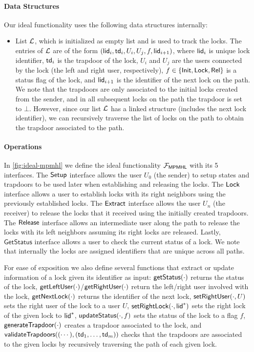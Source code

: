 \paragraph{Data Structures}
Our ideal functionality uses the following data structures internally:

\begin{itemize}
	\item List $\mathcal{L}$, which is initialized as empty list and is used to track the locks. 
	The entries of $\mathcal{L}$ are of the form $(\mathsf{lid}_i, \mathsf{td}_i, U_i, U_j, f, \\ \mathsf{lid}_{i+1})$, 
	where $\mathsf{lid}_i$ is unique lock identifier, $\mathsf{td}_i$ is the trapdoor of the lock, $U_i$ 
	and $U_j$ are the users connected by the lock (the left and right user, respectively), 
	$f \in \{\mathsf{Init},\mathsf{Lock},\mathsf{Rel}\}$ is a status flag of the lock, and $\mathsf{lid}_{i+1}$ is the 
	identifier of the next lock on the path. We note that the trapdoors are only associated 
	to the initial locks created from the sender, and in all subsequent locks on the path the 
	trapdoor is set to $\bot$. However, since our list $\mathcal{L}$ has a linked structure (includes 
	the next lock identifier), we can recursively traverse the list of locks on the path to 
	obtain the trapdoor associated to the path.
\end{itemize}

\paragraph{Operations}
In \cref{fig:ideal-mpmhl} we define the ideal functionality $\mathcal{F}_{\mathsf{MPMHL}}$ with its 5 
interfaces. The $\mathsf{Setup}$ interface allows the user $U_0$ (the sender) to setup states and 
trapdoors to be used later when establishing and releasing the locks. The $\mathsf{Lock}$ interface 
allows a user to establish locks with its right neighbors using the previously established 
locks. The $\mathsf{Extract}$ interface allows the user $U_n$ (the receiver) to release the locks that it 
received using the initially created trapdoors. The $\mathsf{Release}$ interface allows an intermediate 
user along the path to release the locks with its left neighbors assuming its right locks are 
released. Lastly, $\mathsf{GetStatus}$ interface allows a user to check the current status of 
a lock. We note that internally the locks are assigned identifiers that are unique across all 
paths.

For ease of exposition we also define several functions that extract or update information of 
a lock given its identifier as input: $\mathsf{getStatus}(\cdot)$ returns the status of the lock, 
$\mathsf{getLeftUser}(\cdot)$/$\mathsf{getRightUser}(\cdot)$ return the left/right user involved with the 
lock, $\mathsf{getNextLock}(\cdot)$ returns the identifier of the next lock, $\mathsf{setRightUser}(\cdot, U)$ 
sets the right user of the lock to a user $U$, $\mathsf{setRightLock}(\cdot, \mathsf{lid}^*)$ sets the right lock 
of the given lock to $\mathsf{lid}^*$, $\mathsf{updateStatus}(\cdot, f)$ sets the status of the lock to a flag 
$f$, $\mathsf{generateTrapdoor}(\cdot)$ creates a trapdoor associated to the lock, and 
$\mathsf{validateTrapdoors}((\cdots), (\mathsf{td}_1,\ldots,\mathsf{td}_m))$ checks that the trapdoors are associated 
to the given locks by recursively traversing the path of each given lock.

